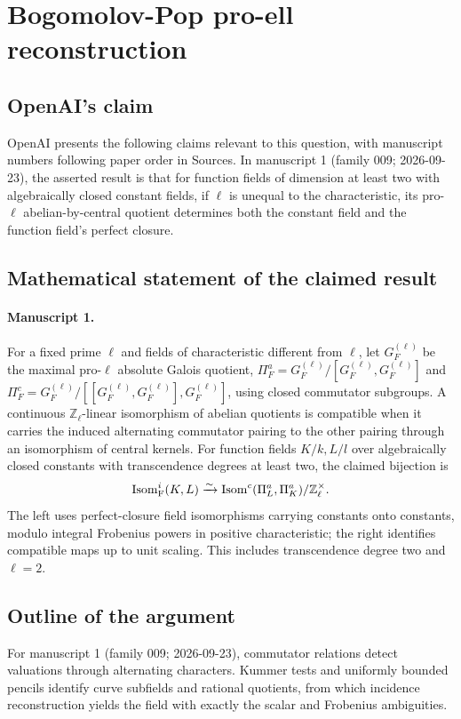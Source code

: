 \documentclass[11pt]{article}
\begin{document}
\section*{Bogomolov-Pop pro-ell reconstruction}

\subsection{OpenAI's claim}
OpenAI presents the following claims relevant to this question, with manuscript numbers following paper order in Sources. In manuscript 1 (family 009; 2026-09-23), the asserted result is that for function fields of dimension at least two with algebraically closed constant fields, if $\ell$ is unequal to the characteristic, its pro-$\ell$ abelian-by-central quotient determines both the constant field and the function field's perfect closure.

\subsection{Mathematical statement of the claimed result}
\paragraph{Manuscript 1.}
For a fixed prime $\ell$ and fields of characteristic different from $\ell$, let $G_F^{(\ell)}$ be the maximal pro-$\ell$ absolute Galois quotient, $\Pi_F^a=G_F^{(\ell)}/[G_F^{(\ell)},G_F^{(\ell)}]$ and $\Pi_F^c=G_F^{(\ell)}/[[G_F^{(\ell)},G_F^{(\ell)}],G_F^{(\ell)}]$, using closed commutator subgroups. A continuous $\mathbb Z_{\ell}$-linear isomorphism of abelian quotients is compatible when it carries the induced alternating commutator pairing to the other pairing through an isomorphism of central kernels. For function fields $K/k,L/l$ over algebraically closed constants with transcendence degrees at least two, the claimed bijection is
\[
 \operatorname{Isom}_{\rm F}^{i}(K,L)\xrightarrow{\sim}
 \operatorname{Isom}^{c}(\Pi_L^a,\Pi_K^a)/\mathbb Z_{\ell}^{\times}.
\]
The left uses perfect-closure field isomorphisms carrying constants onto constants, modulo integral Frobenius powers in positive characteristic; the right identifies compatible maps up to unit scaling. This includes transcendence degree two and $\ell=2$.

\subsection{Outline of the argument}
For manuscript 1 (family 009; 2026-09-23), commutator relations detect valuations through alternating characters. Kummer tests and uniformly bounded pencils identify curve subfields and rational quotients, from which incidence reconstruction yields the field with exactly the scalar and Frobenius ambiguities.
\end{document}
